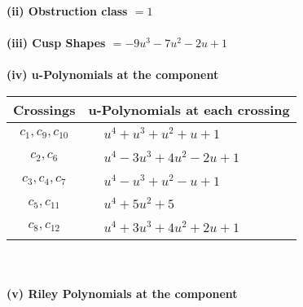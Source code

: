 \documentclass[1p]{elsarticle_modified}
\theoremstyle{definition}
\begin{document}
\flushleft \textbf{(ii) Obstruction class $= 1$}\\~\\
\flushleft \textbf{(iii) Cusp Shapes $= -9 u^3-7 u^2-2 u+1$}\\~\\
\newpage\renewcommand{\arraystretch}{1}
\flushleft \textbf{(iv) u-Polynomials at the component}\newline \\
\begin{tabular}{m{50pt}|m{274pt}}
Crossings & \hspace{64pt}u-Polynomials at each crossing \\
\hline $$\begin{aligned}c_{1},c_{9},c_{10}\end{aligned}$$&$\begin{aligned}
&u^4+u^3+u^2+u+1
\end{aligned}$\\
\hline $$\begin{aligned}c_{2},c_{6}\end{aligned}$$&$\begin{aligned}
&u^4-3 u^3+4 u^2-2 u+1
\end{aligned}$\\
\hline $$\begin{aligned}c_{3},c_{4},c_{7}\end{aligned}$$&$\begin{aligned}
&u^4- u^3+u^2- u+1
\end{aligned}$\\
\hline $$\begin{aligned}c_{5},c_{11}\end{aligned}$$&$\begin{aligned}
&u^4+5 u^2+5
\end{aligned}$\\
\hline $$\begin{aligned}c_{8},c_{12}\end{aligned}$$&$\begin{aligned}
&u^4+3 u^3+4 u^2+2 u+1
\end{aligned}$\\
\hline
\end{tabular}\\~\\
\newpage\renewcommand{\arraystretch}{1}
\flushleft \textbf{(v) Riley Polynomials at the component}\newline \\
\end{document}
